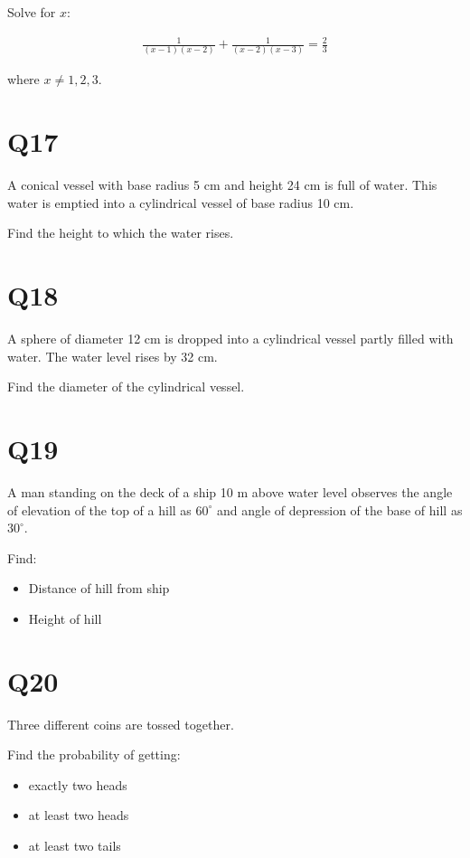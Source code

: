 \documentclass[12pt]{article}
\begin{document}
Solve for $x$:

\begin{align*}
\frac{1}{(x-1)(x-2)}
+
\frac{1}{(x-2)(x-3)}
=
\frac{2}{3}
\end{align*}

where $x \neq 1,2,3$.

\section*{Q17}

A conical vessel with base radius 5 cm and height 24 cm is full of water. This water is emptied into a cylindrical vessel of base radius 10 cm.

Find the height to which the water rises.

\section*{Q18}

A sphere of diameter 12 cm is dropped into a cylindrical vessel partly filled with water. The water level rises by 32 cm.

Find the diameter of the cylindrical vessel.

\section*{Q19}

A man standing on the deck of a ship 10 m above water level observes the angle of elevation of the top of a hill as $60^\circ$ and angle of depression of the base of hill as $30^\circ$.

Find:

\begin{itemize}

\item Distance of hill from ship

\item Height of hill

\end{itemize}

\section*{Q20}

Three different coins are tossed together.

Find the probability of getting:

\begin{itemize}

\item exactly two heads

\item at least two heads

\item at least two tails

\end{itemize}
\end{document}
